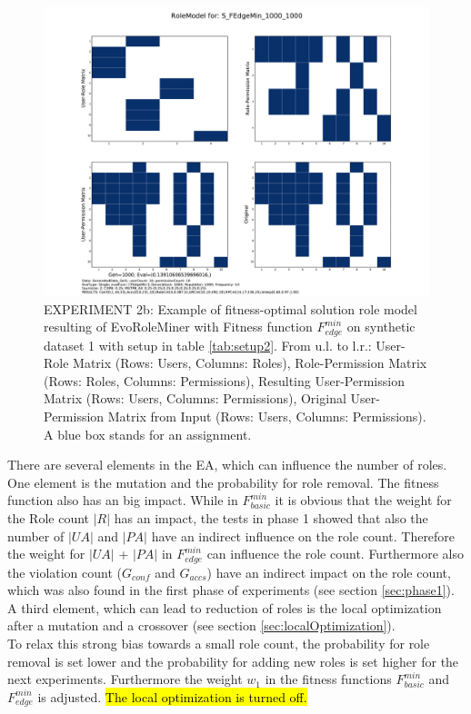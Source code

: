 \begin{figure}[H]
	\centering
	\includegraphics[scale=0.37, trim=4cm 2cm 4cm 2cm, clip=true]{./Figures/exp2edge_RM}
	\caption{EXPERIMENT 2b: Example of fitness-optimal solution role model resulting of EvoRoleMiner with Fitness function $F_{edge}^{min}$ on synthetic dataset 1 with setup in table \ref{tab:setup2}. From u.l. to l.r.: User-Role Matrix (Rows: Users, Columns: Roles), Role-Permission Matrix (Rows: Roles, Columns: Permissions), Resulting User-Permission Matrix (Rows: Users, Columns: Permissions), Original User-Permission Matrix from Input (Rows: Users, Columns: Permissions). A blue box stands for an assignment.}
	\label{fig:exp2edge_RM}
\end{figure}

There are several elements in the EA, which can influence the number of roles. One element is the mutation and the probability for role removal. The fitness function also has an big impact. While in $F_{basic}^{min}$ it is obvious that the weight for the Role count $|R|$ has an impact, the tests in phase 1 showed that also the number of $|UA|$ and $|PA|$ have an indirect influence on the role count. Therefore the weight for $|UA|$ + $|PA|$ in $F_{edge}^{min}$ can influence the role count. Furthermore also the violation count ($G_{conf}$ and $G_{accs}$) have an indirect impact on the role count, which was also found in the first phase of experiments (see section \ref{sec:phase1}). A third element, which can lead to reduction of roles is the local optimization after a mutation and a crossover (see section \ref{sec:localOptimization}).\\
To relax this strong bias towards a small role count, the probability for role removal is set lower and the probability for adding new roles is set higher for the next experiments. Furthermore the weight $w_1$ in the fitness functions $F_{basic}^{min}$ and $F_{edge}^{min}$ is adjusted. \hl{The local optimization is turned off.}